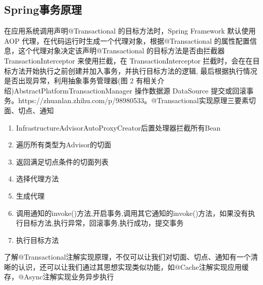 \documentclass[../../../interview-questions.tex]{subfiles}
\begin{document}
\subsection{Spring事务原理}

在应用系统调用声明@Transactional 的目标方法时，Spring Framework 默认使用 AOP 代理，在代码运行时生成一个代理对象，根据@Transactional 的属性配置信息，这个代理对象决定该声明@Transactional 的目标方法是否由拦截器 TransactionInterceptor 来使用拦截，在 TransactionInterceptor 拦截时，会在在目标方法开始执行之前创建并加入事务，并执行目标方法的逻辑, 最后根据执行情况是否出现异常，利用抽象事务管理器(图 2 有相关介绍)AbstractPlatformTransactionManager 操作数据源 DataSource 提交或回滚事务。https://zhuanlan.zhihu.com/p/98980533。@Transactional实现原理三要素切面、切点、通知

\begin{enumerate}
    \item {InfrastructureAdvisorAutoProxyCreator后置处理器拦截所有Bean}
    \item {遍历所有类型为Advisor的切面}
    \item {返回满足切点条件的切面列表}
    \item {选择代理方法}
    \item {生成代理}
    \item {调用通知的invoke()方法,开启事务,调用其它通知的invoke()方法，如果没有执行目标方法,执行异常，回滚事务,执行成功，提交事务}
    \item {执行目标方法}
\end{enumerate}

了解@Transactional注解实现原理，不仅可以让我们对切面、切点、通知有一个清晰的认识，还可以让我们通过其思想实现类似功能，如@Cache注解实现应用缓存，@Async注解实现业务异步执行
\end{document}
